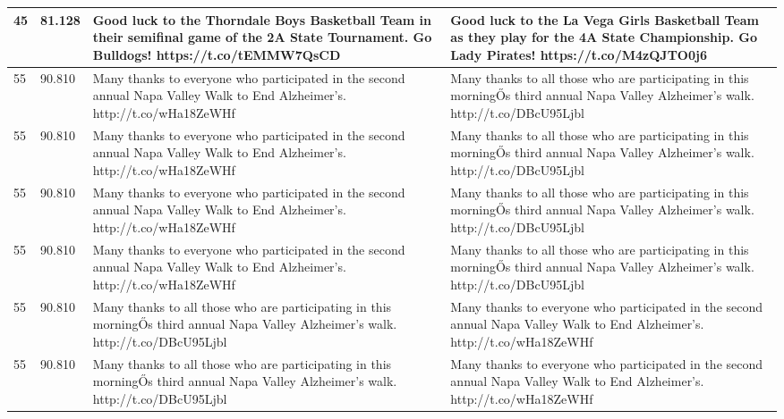 {\begin{table}[]
\begin{tabular}{|p{}|p{}|p{}|p{}|}
45       & 81.128                      & Good luck to the Thorndale Boys Basketball Team in their semifinal game of the 2A State Tournament. Go Bulldogs! https://t.co/tEMMW7QsCD                & Good luck to the La Vega Girls Basketball Team as they play for the 4A State Championship. Go Lady Pirates! https://t.co/M4zQJTO0j6                 \\ \hline
55       & 90.810                      & Many thanks to everyone who participated in the second annual Napa Valley Walk to End Alzheimer's. http://t.co/wHa18ZeWHf                               & Many thanks to all those who are participating in this morningŐs third annual Napa Valley Alzheimer's walk. http://t.co/DBcU95Ljbl                  \\ \hline
55       & 90.810                      & Many thanks to everyone who participated in the second annual Napa Valley Walk to End Alzheimer's. http://t.co/wHa18ZeWHf                               & Many thanks to all those who are participating in this morningŐs third annual Napa Valley Alzheimer's walk. http://t.co/DBcU95Ljbl                  \\ \hline
55       & 90.810                      & Many thanks to everyone who participated in the second annual Napa Valley Walk to End Alzheimer's. http://t.co/wHa18ZeWHf                               & Many thanks to all those who are participating in this morningŐs third annual Napa Valley Alzheimer's walk. http://t.co/DBcU95Ljbl                  \\ \hline
55       & 90.810                      & Many thanks to everyone who participated in the second annual Napa Valley Walk to End Alzheimer's. http://t.co/wHa18ZeWHf                               & Many thanks to all those who are participating in this morningŐs third annual Napa Valley Alzheimer's walk. http://t.co/DBcU95Ljbl                  \\ \hline
55       & 90.810                      & Many thanks to all those who are participating in this morningŐs third annual Napa Valley Alzheimer's walk. http://t.co/DBcU95Ljbl                      & Many thanks to everyone who participated in the second annual Napa Valley Walk to End Alzheimer's. http://t.co/wHa18ZeWHf                           \\ \hline
55       & 90.810                      & Many thanks to all those who are participating in this morningŐs third annual Napa Valley Alzheimer's walk. http://t.co/DBcU95Ljbl                      & Many thanks to everyone who participated in the second annual Napa Valley Walk to End Alzheimer's. http://t.co/wHa18ZeWHf                           \\ \hline

\end{tabular}
\end{table}}
